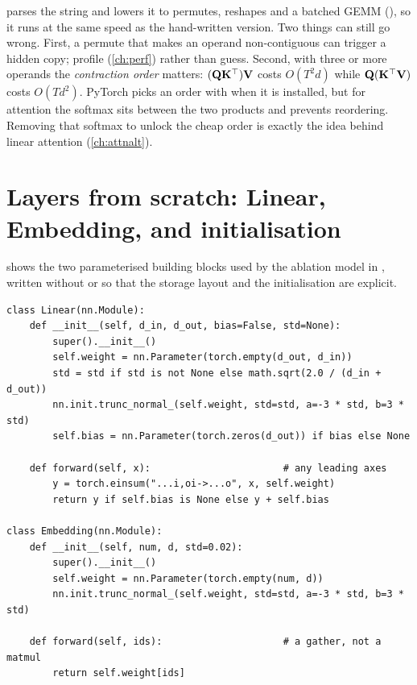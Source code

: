\begin{systemslens}
 parses the string and lowers it to permutes, reshapes and a batched GEMM
(), so it runs at the same speed as the hand-written version. Two things can still go
wrong. First, a permute that makes an operand non-contiguous can trigger a hidden copy; profile
(\cref{ch:perf}) rather than guess. Second, with three or more operands the \emph{contraction
order} matters: $(\mathbf{Q}\mathbf{K}^\top)\mathbf{V}$ costs $O(T^2 d)$ while $\mathbf{Q}(\mathbf{K}^\top\mathbf{V})$
costs $O(T d^2)$. PyTorch picks an order with  when it is installed, but for
attention the softmax sits between the two products and prevents reordering. Removing that
softmax to unlock the cheap order is exactly the idea behind linear attention (\cref{ch:attnalt}).
\end{systemslens}

\section{Layers from scratch: Linear, Embedding, and initialisation}\label{sec:archdesign:init}

 shows the two parameterised building blocks used by the ablation model
in , written without  or  so that the
storage layout and the initialisation are explicit.

\begin{lstlisting}[caption={Linear and Embedding layers from scratch (\texttt{llmsys/ablate.py}).},label={lst:archdesign:linear}]
class Linear(nn.Module):
    def __init__(self, d_in, d_out, bias=False, std=None):
        super().__init__()
        self.weight = nn.Parameter(torch.empty(d_out, d_in))
        std = std if std is not None else math.sqrt(2.0 / (d_in + d_out))
        nn.init.trunc_normal_(self.weight, std=std, a=-3 * std, b=3 * std)
        self.bias = nn.Parameter(torch.zeros(d_out)) if bias else None

    def forward(self, x):                       # any leading axes
        y = torch.einsum("...i,oi->...o", x, self.weight)
        return y if self.bias is None else y + self.bias

class Embedding(nn.Module):
    def __init__(self, num, d, std=0.02):
        super().__init__()
        self.weight = nn.Parameter(torch.empty(num, d))
        nn.init.trunc_normal_(self.weight, std=std, a=-3 * std, b=3 * std)

    def forward(self, ids):                     # a gather, not a matmul
        return self.weight[ids]
\end{lstlisting}

